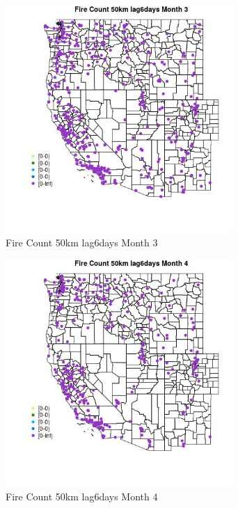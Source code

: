 \begin{figure} 
\centering  
\includegraphics[width=0.77\textwidth]{Code_Outputs/Report_ML_input_PM25_Step4_part_e_de_duplicated_aves_compiled_2019-05-18wNAs_MapObsMo3Fire_Count_50km_lag6days.jpg} 
\caption{\label{fig:Report_ML_input_PM25_Step4_part_e_de_duplicated_aves_compiled_2019-05-18wNAsMapObsMo3Fire_Count_50km_lag6days}Fire Count 50km lag6days Month 3} 
\end{figure} 
 

\begin{figure} 
\centering  
\includegraphics[width=0.77\textwidth]{Code_Outputs/Report_ML_input_PM25_Step4_part_e_de_duplicated_aves_compiled_2019-05-18wNAs_MapObsMo4Fire_Count_50km_lag6days.jpg} 
\caption{\label{fig:Report_ML_input_PM25_Step4_part_e_de_duplicated_aves_compiled_2019-05-18wNAsMapObsMo4Fire_Count_50km_lag6days}Fire Count 50km lag6days Month 4} 
\end{figure} 
 

